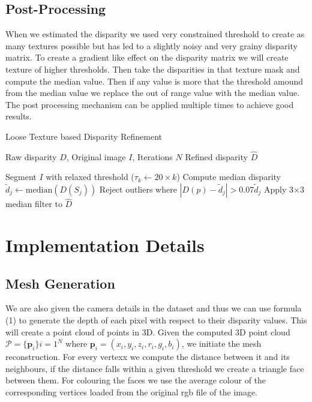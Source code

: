 \documentclass{article}
\begin{document}
\newpage
\subsection{Post-Processing}
\vspace{1cm}
When we estimated the disparity we used very constrained threshold to create as many textures possible but has led to a slightly noisy and very grainy disparity matrix.
To create a gradient like effect on the disparity matrix we will create texture of higher thresholds. Then take the disparities in that texture mask and compute the median value.
Then if any value is more that the threshold amound from the median value we replace the out of range value with the median value. The post processing mechanism can be 
applied multiple times to achieve good results.

\medskip
\begin{algorithm}[H]
\caption{Loose Texture based Disparity Refinement}
\begin{algorithmic}[1]
\Require{} Raw disparity $D$, Original image $I$, Iterations $N$
\Ensure{} Refined disparity $\hat{D}$

    \State{} Segment $I$ with relaxed threshold ($\tau_k \gets 20 \times k$)
        \State{} Compute median disparity $\tilde{d}_j \gets \mathrm{median}(D(S_j))$
        \State{} Reject outliers where $|D(p) - \tilde{d}_j| > 0.07\tilde{d}_j$
    \EndFor{}
    \State{} Apply 3$\times$3 median filter to $\hat{D}$
\EndFor{}
\end{algorithmic}
\end{algorithm}

\newpage
\section{Implementation Details}
\vspace{1cm}
\subsection{Mesh Generation}
\vspace{1cm}
We are also given the camera details in the dataset and thus we can use formula (1) to generate the depth of each pixel with respect to their disparity values. This will create a point
cloud of points in 3D. Given the computed 3D point cloud $\mathcal{P} = \{\mathbf{p}_i\} {i=1}^N$ where $\mathbf{p}_i = (x_i, y_i, z_i, r_i, g_i, b_i)$, we initiate the mesh reconstruction.
For every vertexx we compute the distance between it and its neighbours, if the distance falls within a given threshold we create a triangle face between them. For colouring the faces
we use the average colour of the corresponding vertices loaded from the original rgb file of the image.
\end{document}
